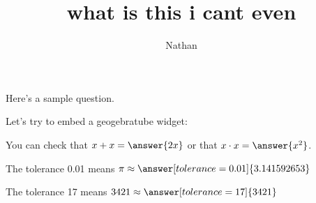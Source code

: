 \documentclass{ximera}
\title{what is this i cant even}
\author{Nathan}
\begin{document}
\maketitle

Here's a sample question.

\begin{problem}
\begin{multipleChoice}
\end{multipleChoice}
\end{problem}

Let's try to embed a geogebratube widget:




\begin{problem}
   You can check that $x + x = \answer{2x}$ or that $x \cdot x = \answer{x^2}$.
\end{problem}

\begin{problem}
   The tolerance 0.01 means $\pi \approx \answer[tolerance=0.01]{3.141592653}$
\end{problem}

\begin{problem}
   The tolerance 17 means $3421 \approx \answer[tolerance=17]{3421}$
\end{problem}
\end{document}
